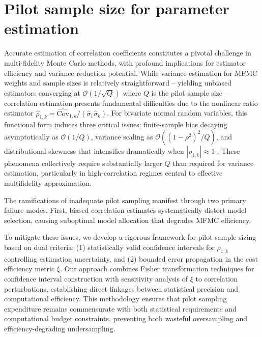 \section{Pilot sample size for parameter estimation}\label{sec:Parameter_Estimation}
Accurate estimation of correlation coefficients constitutes a pivotal challenge in multi-fidelity Monte Carlo methods, with profound implications for estimator efficiency and variance reduction potential. While variance estimation for MFMC weights and sample sizes is relatively straightforward -- yielding unbiased estimators converging at $\mathcal{O}(1/\sqrt{Q})$ where $Q$ is the pilot sample size -- correlation estimation presents fundamental difficulties due to the nonlinear ratio estimator $\widehat{\rho}_{1,k} = \widehat{\text{Cov}}_{1,k}/(\widehat{\sigma}_1\widehat{\sigma}_k)$. For bivariate normal random variables, this functional form induces three critical issues: finite-sample bias decaying asymptotically as $\mathcal{O}(1/Q)$, variance scaling as $\mathcal{O}((1-\rho^2)^2/Q)$, and distributional skewness that intensifies dramatically when $|\rho_{1,k}|\approx 1$ \cite{Fi:1915,Ha:2007,Ri:1932,So:1913}. These phenomena collectively require substantially larger $Q$ than required for variance estimation, particularly in high-correlation regimes central to effective multifidelity approximation.


The ramifications of inadequate pilot sampling manifest through two primary failure modes. First, biased correlation estimates systematically distort model selection, causing suboptimal model allocation that degrades MFMC efficiency. 


To mitigate these issues, we develop a rigorous framework for pilot sample sizing based on dual criteria: (1) statistically valid confidence intervals for $\rho_{1,k}$ controlling estimation uncertainty, and (2) bounded error propagation in the cost efficiency metric $\xi$. Our approach combines Fisher transformation techniques for confidence interval construction with sensitivity analysis of $\xi$ to correlation perturbations, establishing direct linkages between statistical precision and computational efficiency. This methodology ensures that pilot sampling expenditure remains commensurate with both statistical requirements and computational budget constraints, preventing both wasteful oversampling and efficiency-degrading undersampling.


